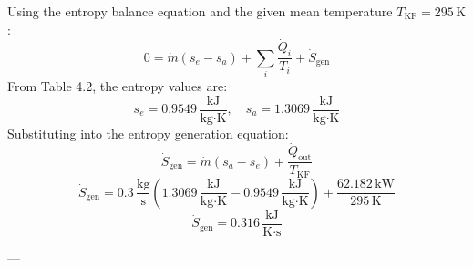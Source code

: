 Using the entropy balance equation and the given mean temperature \( T_{\text{KF}} = 295 \, \text{K} \):  
\[
0 = \dot{m}(s_e - s_a) + \sum_i \frac{\dot{Q}_i}{T_i} + \dot{S}_{\text{gen}}
\]  
From Table 4.2, the entropy values are:  
\[
s_e = 0.9549 \, \frac{\text{kJ}}{\text{kg·K}}, \quad s_a = 1.3069 \, \frac{\text{kJ}}{\text{kg·K}}
\]  
Substituting into the entropy generation equation:  
\[
\dot{S}_{\text{gen}} = \dot{m}(s_a - s_e) + \frac{\dot{Q}_{\text{out}}}{T_{\text{KF}}}
\]  
\[
\dot{S}_{\text{gen}} = 0.3 \, \frac{\text{kg}}{\text{s}} \left( 1.3069 \, \frac{\text{kJ}}{\text{kg·K}} - 0.9549 \, \frac{\text{kJ}}{\text{kg·K}} \right) + \frac{62.182 \, \text{kW}}{295 \, \text{K}}
\]  
\[
\dot{S}_{\text{gen}} = 0.316 \, \frac{\text{kJ}}{\text{K·s}}
\]  

---